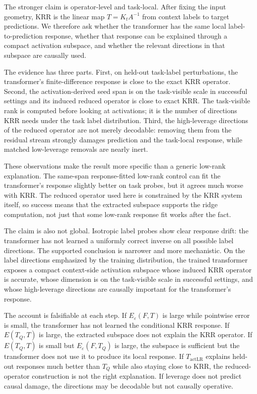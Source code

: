 \documentclass[11pt]{article}
\begin{document}
The stronger claim is operator-level and task-local. After fixing the input geometry, KRR is the
linear map \(T=K_tA^{-1}\) from context labels to target predictions. We therefore ask whether the
transformer has the same local label-to-prediction response, whether that response can be explained
through a compact activation subspace, and whether the relevant directions in that subspace are
causally used.

The evidence has three parts. First, on held-out task-label perturbations, the transformer's
finite-difference response is close to the exact KRR operator. Second, the activation-derived seed
span is on the task-visible scale in successful settings and its induced reduced operator is close to
exact KRR. The task-visible rank is computed before looking at activations; it is the number of
directions KRR needs under the task label distribution. Third, the high-leverage directions of the
reduced operator are not merely decodable: removing them from the residual stream strongly damages
prediction and the task-local response, while matched low-leverage removals are nearly inert.

These observations make the result more specific than a generic low-rank explanation. The
same-span response-fitted low-rank control can fit the transformer's response slightly better on task
probes, but it agrees much worse with KRR. The reduced operator used here is constrained by the
KRR system itself, so success means that the extracted subspace supports the ridge computation,
not just that some low-rank response fit works after the fact.

The claim is also not global. Isotropic label probes show clear response drift: the transformer has
not learned a uniformly correct inverse on all possible label directions. The supported conclusion is
narrower and more mechanistic. On the label directions emphasized by the training distribution,
the trained transformer exposes a compact context-side activation subspace whose induced KRR
operator is accurate, whose dimension is on the task-visible scale in successful settings, and whose
high-leverage directions are causally important for the transformer's response.

The account is falsifiable at each step. If \(E_\varepsilon(F,T)\) is large while pointwise error is small,
the transformer has not learned the conditional KRR response. If \(E(T_Q,T)\) is large, the extracted
subspace does not explain the KRR operator. If \(E(T_Q,T)\) is small but \(E_\varepsilon(F,T_Q)\) is
large, the subspace is sufficient but the transformer does not use it to produce its local response. If
\(T_{\mathrm{actLR}}\) explains held-out responses much better than \(T_Q\) while also staying close to
KRR, the reduced-operator construction is not the right explanation. If leverage does not predict
causal damage, the directions may be decodable but not causally operative.
\end{document}
